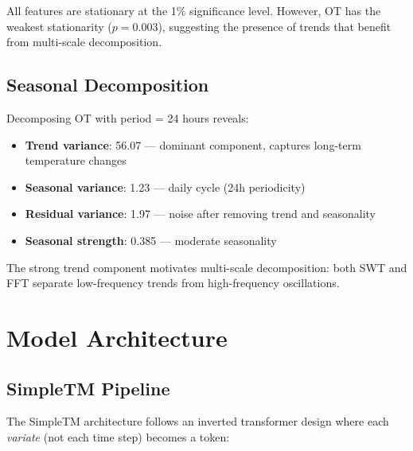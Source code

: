 \documentclass[12pt,a4paper]{article}
\begin{document}
All features are stationary at the 1\% significance level. However, OT has the weakest stationarity ($p = 0.003$), suggesting the presence of trends that benefit from multi-scale decomposition.

\subsection{Seasonal Decomposition}

Decomposing OT with period = 24 hours reveals:
\begin{itemize}[noitemsep]
  \item \textbf{Trend variance}: 56.07 --- dominant component, captures long-term temperature changes
  \item \textbf{Seasonal variance}: 1.23 --- daily cycle (24h periodicity)
  \item \textbf{Residual variance}: 1.97 --- noise after removing trend and seasonality
  \item \textbf{Seasonal strength}: 0.385 --- moderate seasonality
\end{itemize}

The strong trend component motivates multi-scale decomposition: both SWT and FFT separate low-frequency trends from high-frequency oscillations.

\section{Model Architecture}

\subsection{SimpleTM Pipeline}

The SimpleTM architecture follows an inverted transformer design where each \textit{variate} (not each time step) becomes a token:
\end{document}
